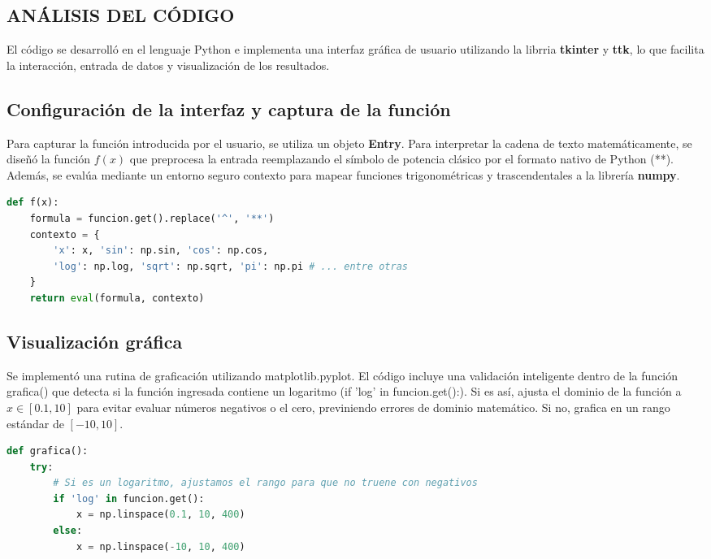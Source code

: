 \documentclass{rmf-d}
\begin{document}
\begin{multicols}{2}
\section{ANÁLISIS DEL CÓDIGO}
\label{sec:3}
El código se desarrolló en el lenguaje Python e implementa una interfaz gráfica de usuario utilizando la librria \textbf{tkinter} y \textbf{ttk}, lo que facilita la interacción, entrada de datos y visualización de los resultados.

\subsection{Configuración de la interfaz y captura de la función}
Para capturar la función introducida por el usuario, se utiliza un objeto \textbf{Entry}. Para interpretar la cadena de texto matemáticamente, se diseñó la función $f(x)$ que preprocesa la entrada reemplazando el símbolo de potencia clásico por el formato nativo de Python (**). Además, se evalúa mediante un entorno seguro contexto para mapear funciones trigonométricas y trascendentales a la librería \textbf{numpy}.

\begin{lstlisting}[language=Python, caption=captura de la función y configuración]
    def f(x):
    formula = funcion.get().replace('^', '**')
    contexto = {
        'x': x, 'sin': np.sin, 'cos': np.cos, 
        'log': np.log, 'sqrt': np.sqrt, 'pi': np.pi # ... entre otras
    }
    return eval(formula, contexto)
    \end{lstlisting}

\subsection{Visualización gráfica}
Se implementó una rutina de graficación utilizando matplotlib.pyplot. El código incluye una validación inteligente dentro de la función grafica() que detecta si la función ingresada contiene un logaritmo (if 'log' in funcion.get():). Si es así, ajusta el dominio de la función a $x \in [0.1, 10]$ para evitar evaluar números negativos o el cero, previniendo errores de dominio matemático. Si no, grafica en un rango estándar de $[-10, 10]$.

\begin{lstlisting}[language=Python, caption=Rutina de graficación con Matplotlib y validación de dominio]
  def grafica():
    try:
        # Si es un logaritmo, ajustamos el rango para que no truene con negativos
        if 'log' in funcion.get():
            x = np.linspace(0.1, 10, 400)
        else:
            x = np.linspace(-10, 10, 400)
            

\end{lstlisting}
\end{multicols}
\end{document}
